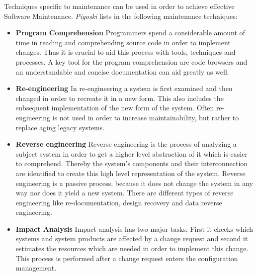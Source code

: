 Techniques specific to maintenance can be used in order to achieve effective Software Maintenance. \textit{Pigoski} lists in \citep{pigoski_software_2015} the following maintenance techniques: \citep{pigoski_software_2015}

\begin{itemize}
    \item \textbf{Program Comprehension}\newline
    Programmers spend a considerable amount of time in reading and comprehending source code in order to implement changes. Thus it is crucial to aid this process with tools, techniques and processes. A key tool for the program comprehension are code browsers and an understandable and concise documentation can aid greatly as well. \citep{pigoski_software_2015}
    
    \item \textbf{Re-engineering}\newline
    In re-engineering a system is first examined and then changed in order to recreate it in a new form. This also includes the subsequent implementation of the new form of the system. Often re-engineering is not used in order to increase maintainability, but rather to replace aging legacy systems. \citep{pigoski_software_2015}
    
    \item \textbf{Reverse engineering}\newline
    Reverse engineering is the process of analyzing a subject system in order to get a higher level abstraction of it which is easier to comprehend. Thereby the system's components and their interconnection are identified to create this high level representation of the system. Reverse engineering is a passive process, because it does not change the system in any way nor does it yield a new system. There are different types of reverse engineering like re-documentation, design recovery and data reverse engineering. \citep{pigoski_software_2015}
    
    \item \textbf{Impact Analysis}\newline
    Impact analysis has two major tasks. First it checks which systems and system products are affected by a change request and second it estimates the resources which are needed in order to implement this change. This process is performed after a change request enters the configuration management. \citep{pigoski_software_2015}
\end{itemize}

